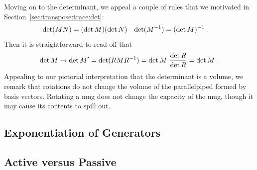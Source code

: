 \documentclass[12pt]{article}
\begin{document}
Moving on to the determinant, we appeal a couple of rules that we motivated in Section~\ref{sec:transpose:trace:det}: 
\begin{align}
    \det(MN) &= (\det M)(\det N)
    &
    \det(M^{-1} ) &= (\det M)^{-1}  \ .
\end{align}
Then it is straightforward to read off that
\begin{align}
    \det M \to \det M' = \det(RMR^{-1} ) = \det M\ \frac{\det R}{\det R} = \det M \ .
\end{align}
Appealing to our pictorial interpretation that the determinant is a volume, we remark that rotations do not change the volume of the parallelpiped formed by basis vectors. Rotating a mug does not change the capacity of the mug, though it may cause its contents to spill out. 



\subsection{Exponentiation of Generators}



\subsection{Active versus Passive}
\label{sec:active:vs:passive}
\end{document}
